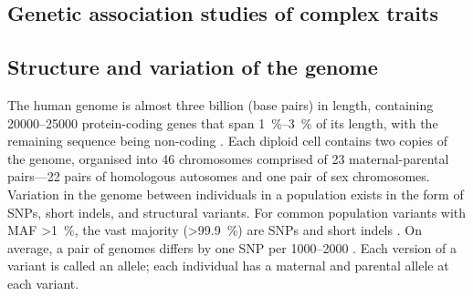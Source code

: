 \begin{outline}
\section{Genetic association studies of complex traits}

\subsection{Structure and variation of the genome}

The human genome is almost three billion \si{\bp} (base pairs) in length, 
containing \numrange{20000}{25000} protein-coding genes that span \SIrange{1}{3}{\percent} of its length, with the remaining sequence being non-coding \autocite{theencodeprojectconsortium2012IntegratedEncyclopediaDNA,1000genomesprojectconsortium2015GlobalReferenceHuman}.
Each diploid cell contains two copies of the genome, organised into 46 chromosomes comprised of 23 maternal-parental pairs---22 pairs of homologous autosomes and one pair of sex chromosomes.
Variation in the genome between individuals in a population exists in the form of \glspl{SNP}, short indels, and structural variants.
For common population variants with \gls{MAF} \SI{>1}{\percent},
the vast majority (\SI{>99.9}{\percent}) are \glspl{SNP} and short indels \autocite{1000genomesprojectconsortium2015GlobalReferenceHuman}.
On average, a pair of genomes differs by one \gls{SNP} per \SIrange{1000}{2000}{\bp} \autocite{theinternationalsnpmapworkinggroup2001MapHumanGenome}.
Each version of a variant is called an allele; each individual has a maternal and parental allele at each variant.


\end{outline}
